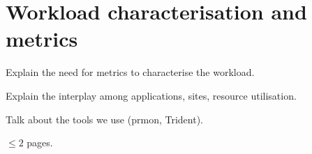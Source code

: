 \section{Workload characterisation and metrics}
Explain the need for metrics to characterise the workload.

Explain the interplay among applications, sites, resource utilisation.

Talk about the tools we use (prmon, Trident).

$\leq 2$ pages.

